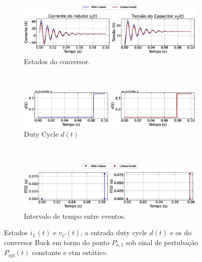 \begin{figure}[H]
  \centering
  \captionsetup{justification=centering}
  \begin{subfigure}{1.\textwidth}
    \centering
    \includegraphics[width=1.\textwidth]{figuras/static-etm/buck/sim1/op1/result.eps}
    \caption{Estados do conversor.}
    \label{fig:buck_converter_constant_pcpl_static_etm_op1_duty_a}
  \end{subfigure}
  \\[6pt]
  \begin{subfigure}{1.\textwidth}
    \centering
    \includegraphics[width=1.\textwidth]{figuras/static-etm/buck/sim1/op1/duty-cycle.eps}
    \caption{Duty Cycle $d(t)$}
    \label{fig:buck_converter_constant_pcpl_static_etm_op1_duty_b}
  \end{subfigure}
  \\[6pt]
  \begin{subfigure}{1.\textwidth}
    \centering
    \includegraphics[width=1.\textwidth]{figuras/static-etm/buck/sim1/op1/inter-event-times.eps}
    \caption{Intervalo de tempo entre eventos.}
    \label{fig:buck_converter_constant_pcpl_static_etm_op1_duty_c}
  \end{subfigure}
  \caption{Estados $i_L(t)$ e $v_C(t)$, a entrada duty cycle $d(t)$ e os  do conversor Buck em torno do ponto $P_{\mathrm{o}, 1}$ sob sinal de pertubação $P_{\mathrm{cpl}}(t)$ constante e \acrshort{etm} estático.}
\end{figure}

